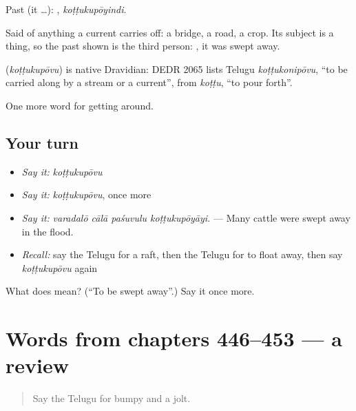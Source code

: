 Past (it …): , \emph{koṭṭukupōyindi}.

Said of anything a current carries off: a bridge, a road, a crop. Its subject is a thing, so the past shown is the third person: , it was swept away.

\begin{cousinweb}
\textbf{} (\emph{koṭṭukupōvu}) is native Dravidian: DEDR 2065 lists Telugu \emph{koṭṭukonipōvu}, \textquotedblleft{}to be carried along by a stream or a current\textquotedblright{}, from \emph{koṭṭu}, \textquotedblleft{}to pour forth\textquotedblright{}.
\end{cousinweb}

\begin{grammarlens}[title={What you've built}]
One more word for getting around.
\end{grammarlens}

\subsection*{Your turn}
\begin{itemize}
\raggedright
  \item \emph{Say it:} \emph{koṭṭukupōvu}
  \item \emph{Say it:} \emph{koṭṭukupōvu}, once more
  \item \emph{Say it:} \emph{varadalō cālā paśuvulu koṭṭukupōyāyi.} — Many cattle were swept away in the flood.
  \item \emph{Recall:} say the Telugu for a raft, then the Telugu for to float away, then say \emph{koṭṭukupōvu} again
\end{itemize}

\begin{tcolorbox}[breakable,colback=teal!4,colframe=teal!35!black,title={Before you move on}]
What does  mean? (\textquotedblleft{}To be swept away\textquotedblright{}.) Say it once more.
\end{tcolorbox}
\section[(dialogue)]{Words from chapters 446–453 — a review}

\label{lesson:TE-R453-review-446-453}



\begin{quote}
Say the Telugu for bumpy and a jolt.
\end{quote}

